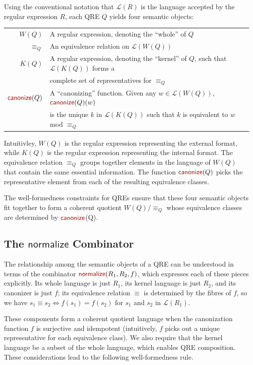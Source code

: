 \documentclass[acmsmall,review,anonymous]{acmart}
\newcommand{\kw}[1]{\textcolor{dkred}{\ensuremath{\mathsf{#1}}}}
\newcommand{\normalize}[3]{\ensuremath{\kw{normalize}(#1, #2, #3)}}
\newcommand{\eqrel}[1]{\ensuremath{\equiv_{#1}}}
\newcommand{\canonize}{\ensuremath{\kw{canonize}}}
\begin{document}
Using the conventional notation that $\mathcal{L}(R)$ is the language accepted
by the regular expression $R$, each QRE $Q$ yields four semantic
objects:

\begin{tabular}{rl}
  $W(Q)$       & A regular expression, denoting the ``whole'' of $Q$\\
  $\eqrel{Q}$  & An equivalence relation on $\mathcal{L}(W(Q))$\\
  $K(Q)$       & A regular expression, denoting the ``kernel'' of $Q$, such that
                  $\mathcal{L}(K(Q))$ forms a \\
               & complete set of representatives for $\eqrel{Q}$ \\
  $\canonize(Q)$ & 
  A ``canonizing'' function. Given any $w \in \mathcal{L}(W(Q))$,
  $\canonize(Q)(w)$ \\ & is the unique $k$ in $\mathcal{L}(K(Q))$ such
  that $k$ is equivalent to $w$ mod $\eqrel{Q}$
\end{tabular}

\noindent
Intuitivley, $W(Q)$ is the regular expression representing the
external format, while $K(Q)$ is the regular expression representing
the internal format.  The equivalence relation $\eqrel{Q}$ groups
together elements in the language of $W(Q)$ that contain the same
essential information.  The function $\canonize(Q)$ picks the
representative element from each of the resulting equivalence classes.

The well-formedness constraints for QREs ensure that these four semantic
objects fit together to form a coherent quotient $W(Q)/\eqrel{Q}$ whose
equivalence classes are determined by \canonize(Q).

\subsection{The \kw{normalize} Combinator}

The relationship among the semantic objects of a QRE can be understood in terms
of the combinator \normalize{R_1}{R_2}{f}, which expresses each of these pieces
explicitly.  Its whole language is just $R_1$, its kernel language is just
$R_2$, and its canonizer is just $f$; 
its equivalence relation $\equiv$ is
determined by the fibres of $f$, so we have
$s_1 \equiv s_2 \Leftrightarrow f(s_1) = f(s_2)$ for $s_1$ and $s_2$
in $\mathcal{L}(R_1)$.

These components form a coherent quotient language when the canonization
function $f$ is surjective and idempotent (intuitively, $f$ picks out a unique
representative for each equivalence class).  We also require that the kernel
language be a subset of the whole language, which enables QRE composition.
These considerations lead to the following well-formedness rule.
\end{document}
